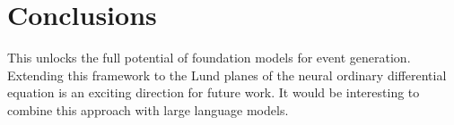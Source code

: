 \section{Conclusions}\label{sec:conclusions}

This unlocks the full potential of foundation models for event
generation. Extending this framework to the Lund planes of the neural
ordinary differential equation is an exciting direction for future work.
It would be interesting to combine this approach with large language
models.

